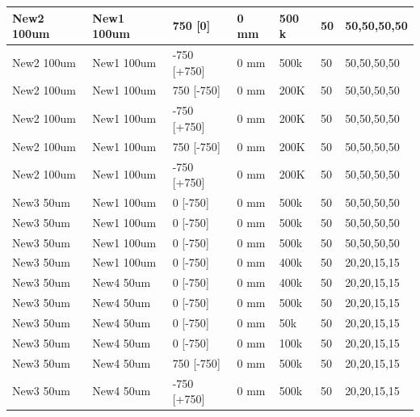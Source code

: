 \begin{refsection}
\begin{table}
\begin{tabular}{|l|l|l|l|l|l|l|}
            New2 100um  & New1 100um  & 750 {[}0{]}      & 0 mm     & 500 k  & 50            & 50,50,50,50       \\ \hline
            New2 100um  & New1 100um  & -750 {[}+750{]}  & 0 mm     & 500k   & 50            & 50,50,50,50       \\ \hline
            New2 100um  & New1 100um  & 750 {[}-750{]}   & 0 mm     & 200K   & 50            & 50,50,50,50       \\ \hline
            New2 100um  & New1 100um  & -750 {[}+750{]}  & 0 mm     & 200K   & 50            & 50,50,50,50       \\ \hline
            New2 100um  & New1 100um  & 750 {[}-750{]}   & 0 mm     & 200K   & 50            & 50,50,50,50       \\ \hline
            New2 100um  & New1 100um  & -750 {[}+750{]}  & 0 mm     & 200K   & 50            & 50,50,50,50       \\ \hline
            New3 50um   & New1 100um  & 0 {[}-750{]}     & 0 mm     & 500k   & 50            & 50,50,50,50       \\ \hline
            New3 50um   & New1 100um  & 0 {[}-750{]}     & 0 mm     & 500k   & 50            & 50,50,50,50       \\ \hline
            New3 50um   & New1 100um  & 0 {[}-750{]}     & 0 mm     & 500k   & 50            & 50,50,50,50       \\ \hline
            New3 50um   & New1 100um  & 0 {[}-750{]}     & 0 mm     & 400k   & 50            & 20,20,15,15       \\ \hline
            New3 50um   & New4 50um   & 0 {[}-750{]}     & 0 mm     & 400k   & 50            & 20,20,15,15       \\ \hline
            New3 50um   & New4 50um   & 0 {[}-750{]}     & 0 mm     & 500k   & 50            & 20,20,15,15       \\ \hline
            New3 50um   & New4 50um   & 0 {[}-750{]}     & 0 mm     & 50k    & 50            & 20,20,15,15       \\ \hline
            New3 50um   & New4 50um   & 0 {[}-750{]}     & 0 mm     & 100k   & 50            & 20,20,15,15       \\ \hline
            New3 50um   & New4 50um   & 750 {[}-750{]}   & 0 mm     & 500k   & 50            & 20,20,15,15       \\ \hline
            New3 50um   & New4 50um   & -750 {[}+750{]}  & 0 mm     & 500k   & 50            & 20,20,15,15       \\ \hline

\end{tabular}
\end{table}
\end{refsection}
